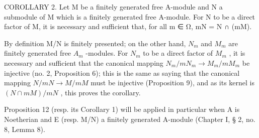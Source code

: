 COROLLARY 2. Let M be a finitely generated free A-module and N a submodule of M which is a finitely generated free A-module. For N to be a direct factor of M, it is necessary and sufficient that, for all m ∈ Ω, mN = N ∩ (mM).

By definition M/N is finitely presented; on the other hand, \(N_{m}\) and \(M_{m}\) are finitely generated free \(A_{m}\) -modules. For \(N_{m}\) to be a direct factor of \(M_{m}\) , it is necessary and sufficient that the canonical mapping \(N_{m}/mN_{m} \rightarrow M_{m}/mM_{m}\) be injective (no. 2, Proposition 6); this is the same as saying that the canonical mapping \(N/mN \rightarrow M/mM\) must be injective (Proposition 9), and as its kernel is \((N \cap mM)/mN\) , this proves the corollary.

Proposition 12 (resp. its Corollary 1) will be applied in particular when A is Noetherian and E (resp. M/N) a finitely generated A-module (Chapter I, § 2, no. 8, Lemma 8).

